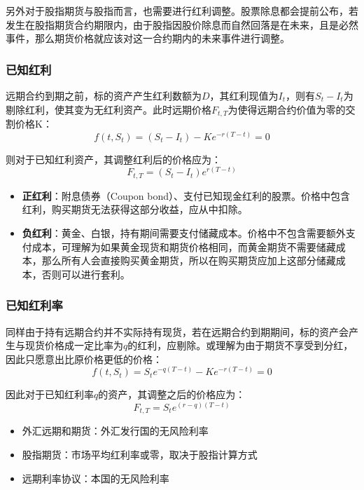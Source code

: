 \documentclass[11pt]{article}
\begin{document}
另外对于股指期货与股指而言，也需要进行红利调整。股票除息都会提前公布，若发生在股指期货合约期限内，由于股指因股价除息而自然回落是在未来，且是必然事件，那么期货价格就应该对这一合约期内的未来事件进行调整。

\subsubsection{已知红利}
远期合约到期之前，标的资产产生红利数额为$D$，其红利现值为$I_t$，则有$S_t-I_t$为剔除红利，使其变为无红利资产。此时远期价格$F_{t,T}$为使得远期合约价值为零的交割价格K：
\begin{equation*}
    f(t,S_t) = \left( S_t - I_t \right) - K e^{-r(T-t)} = 0
\end{equation*}

则对于已知红利资产，其调整红利后的价格应为：
\begin{equation*}
    F_{t,T} = \left(S_t - I_t \right)e^{r(T-t)}
\end{equation*}

\begin{itemize}
    \item \textbf{正红利}：附息债券（Coupon bond）、支付已知现金红利的股票。价格中包含红利，购买期货无法获得这部分收益，应从中扣除。
    \item \textbf{负红利}：黄金、白银，持有期间需要支付储藏成本。价格中不包含需要额外支付成本，可理解为如果黄金现货和期货价格相同，而黄金期货不需要储藏成本，那么所有人会直接购买黄金期货，所以在购买期货应加上这部分储藏成本，否则可以进行套利。
\end{itemize}

\subsubsection{已知红利率}

同样由于持有远期合约并不实际持有现货，若在远期合约到期期间，标的资产会产生与现货价格成一定比率为$q$的红利，应剔除。或理解为由于期货不享受到分红，因此只愿意出比原价格更低的价格：
\begin{equation*}
    f(t,S_t) = S_t e^{-q(T-t)} - K e^{-r(T-t)} = 0
\end{equation*}

因此对于已知红利率$q$的资产，其调整之后的价格应为：
\begin{equation*}
    F_{t,T} = S_t e^{(r-q)(T-t)}
\end{equation*}

\begin{itemize}
    \item 外汇远期和期货：外汇发行国的无风险利率
    \item 股指期货：市场平均红利率或零，取决于股指计算方式
    \item 远期利率协议：本国的无风险利率
\end{itemize}
\end{document}
